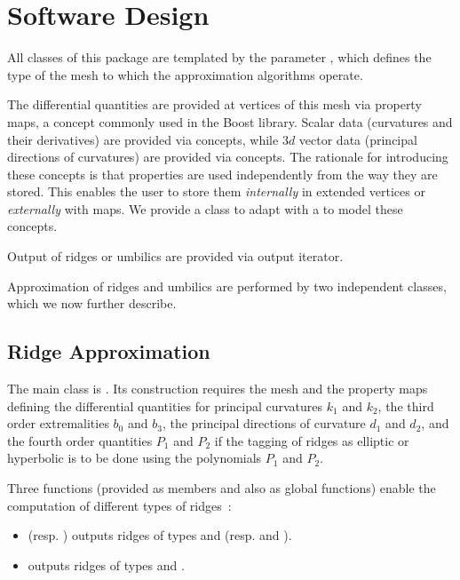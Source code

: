 \section{Software Design}
\label{soft}

All classes of this package are templated by the parameter
, which defines the type of the mesh to which the
approximation algorithms operate.

The differential quantities are provided at vertices of this mesh via
property maps, a concept commonly used in the Boost library. Scalar
data (curvatures and their derivatives) are provided via
 concepts, while  $3d$ vector data (principal
directions of curvatures) are provided via
 concepts. 
The rationale for introducing these concepts is that properties are
used independently from the way they are stored. This enables the user
to store them {\em internally} in extended vertices or {\em externally}
with maps. We provide a class
 to adapt  with 
a  to model these concepts.


Output of ridges or umbilics are provided via output iterator.

Approximation of ridges and umbilics are performed by two independent
classes, which we now further describe.

\subsection{Ridge Approximation}


The main class is
.
Its construction requires the mesh and the property maps defining the
differential quantities for principal curvatures $k_1$ and $k_2$, the
third order extremalities $b_0$ and $b_3$, the principal directions of
curvature $d_1$ and $d_2$, and the fourth order quantities $P_1$ and
$P_2$ if the tagging of ridges as elliptic or hyperbolic is to be done using
the polynomials $P_1$ and $P_2$.


Three functions (provided as members and also as global functions)
enable the computation of different types of ridges~:
\begin{itemize}
\item {} (resp. )
  outputs ridges of types  and
   (resp.  and
  ).
\item {} outputs ridges of types
   and .
\end{itemize}

